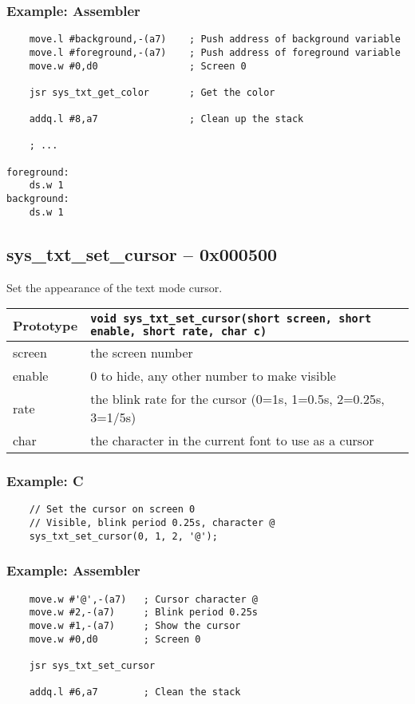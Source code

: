 \subsubsection*{Example: Assembler}
\begin{verbatim}
    move.l #background,-(a7)    ; Push address of background variable
    move.l #foreground,-(a7)    ; Push address of foreground variable
    move.w #0,d0                ; Screen 0

    jsr sys_txt_get_color       ; Get the color

    addq.l #8,a7                ; Clean up the stack

    ; ...

foreground:
    ds.w 1
background:
    ds.w 1
\end{verbatim}

\subsection*{sys\_txt\_set\_cursor -- 0x000500}
Set the appearance of the text mode cursor.

\bigskip

\begin{tabular}{|l||l|} \hline
Prototype & \lstinline!void sys_txt_set_cursor(short screen, short enable, short rate, char c)! \\ \hline
screen & the screen number \\ \hline
enable & 0 to hide, any other number to make visible \\ \hline
rate & the blink rate for the cursor (0=1s, 1=0.5s, 2=0.25s, 3=1/5s) \\ \hline
char & the character in the current font to use as a cursor \\ \hline
\end{tabular}

\subsubsection*{Example: C}
\begin{lstlisting}
    // Set the cursor on screen 0
    // Visible, blink period 0.25s, character @
    sys_txt_set_cursor(0, 1, 2, '@');
\end{lstlisting}

\subsubsection*{Example: Assembler}
\begin{verbatim}
    move.w #'@',-(a7)   ; Cursor character @
    move.w #2,-(a7)     ; Blink period 0.25s
    move.w #1,-(a7)     ; Show the cursor
    move.w #0,d0        ; Screen 0

    jsr sys_txt_set_cursor

    addq.l #6,a7        ; Clean the stack
\end{verbatim}


